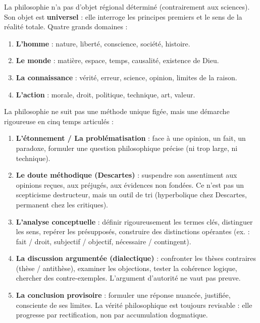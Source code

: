 \documentclass[11pt]{article}
\newcommand{\cle}[1]{{\popxbold\color{popdark}#1}}
\newcounter{popsec}
\newcounter{popsub}
\newcommand{\courssub}[1]{%
  \stepcounter{popsub}%
  \par\vspace{9pt}\noindent{\popxbold\fontsize{11.5}{13}\selectfont\color{popink}{\color{poporange}\thepopsec.\thepopsub}\hspace{6pt}#1}\par\nopagebreak\vspace{4pt}
}
\begin{document}
\begin{aretenir}
La philosophie n'a pas d'objet régional déterminé (contrairement aux sciences). Son objet est \textbf{universel} : elle interroge les \cle{principes premiers} et le \cle{sens} de la réalité totale. Quatre grands domaines :
\begin{enumerate}
\item \textbf{L'homme} : nature, liberté, conscience, société, histoire.
\item \textbf{Le monde} : matière, espace, temps, causalité, existence de Dieu.
\item \textbf{La connaissance} : vérité, erreur, science, opinion, limites de la raison.
\item \textbf{L'action} : morale, droit, politique, technique, art, valeur.
\end{enumerate}
\end{aretenir}

\courssub{La méthode de la philosophie}

\begin{methode}
La philosophie ne suit pas une méthode unique figée, mais une \cle{démarche rigoureuse} en cinq temps articulés :
\begin{enumerate}
\item \textbf{L'étonnement / La problématisation} : face à une opinion, un fait, un paradoxe, formuler une \cle{question philosophique} précise (ni trop large, ni technique).
\item \textbf{Le doute méthodique (Descartes)} : suspendre son assentiment aux opinions reçues, aux préjugés, aux évidences non fondées. Ce n'est pas un scepticisme destructeur, mais un \cle{outil de tri} (hyperbolique chez Descartes, permanent chez les critiques).
\item \textbf{L'analyse conceptuelle} : définir rigoureusement les termes clés, distinguer les sens, repérer les présupposés, construire des distinctions opérantes (ex. : fait / droit, subjectif / objectif, nécessaire / contingent).
\item \textbf{La discussion argumentée (dialectique)} : confronter les thèses contraires (thèse / antithèse), examiner les objections, tester la cohérence logique, chercher des contre-exemples. L'argument d'autorité ne vaut pas preuve.
\item \textbf{La conclusion provisoire} : formuler une réponse nuancée, justifiée, consciente de ses limites. La vérité philosophique est toujours \cle{revisable} : elle progresse par rectification, non par accumulation dogmatique.
\end{enumerate}
\end{methode}
\end{document}
